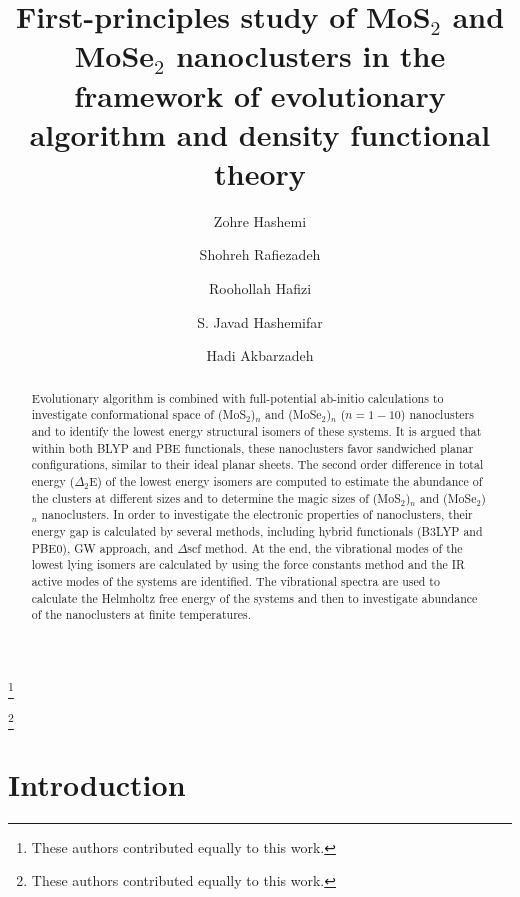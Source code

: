 \documentclass[nofootinbib,10pt,aip,twocolumn,showpacs]{revtex4-1}
\begin{document}
\title{First-principles study of MoS$_{2}$ and MoSe$_{2}$ nanoclusters in the framework 
       of evolutionary algorithm and density functional theory} 
\author{Zohre Hashemi}
\thanks{These authors contributed equally to this work.}
\author{Shohreh Rafiezadeh}
\thanks{These authors contributed equally to this work.}
\author{Roohollah Hafizi}
\author{S. Javad Hashemifar}
\author{Hadi Akbarzadeh}

\begin{abstract}

Evolutionary algorithm is combined with full-potential ab-initio calculations
to investigate conformational space of (MoS$_2$)$_n$ and (MoSe$_2$)$_n$ ($n=1-10$) 
nanoclusters and to identify the lowest energy structural isomers of these systems.
It is argued that within both BLYP and PBE functionals,
these nanoclusters favor sandwiched planar configurations,
similar to their ideal planar sheets.
The second order difference in total energy ($\Delta_2$E) of the lowest energy isomers are computed 
to estimate the abundance of the clusters at different sizes and to 
determine the magic sizes of (MoS$_{2}$)$_n$ and (MoSe$_{2}$)$_n$ nanoclusters.
In order to investigate the electronic properties of nanoclusters, 
their energy gap is calculated by several methods,
including hybrid functionals (B3LYP and PBE0), GW approach, and $\Delta$scf method.
At the end, the vibrational modes of the lowest lying isomers are calculated
by using the force constants method and the IR active modes of the systems are identified.
The vibrational spectra are used to calculate the Helmholtz free energy of 
the systems and then to investigate abundance of the nanoclusters at finite temperatures.

\end{abstract}
\maketitle



\section{Introduction}
\end{document}

